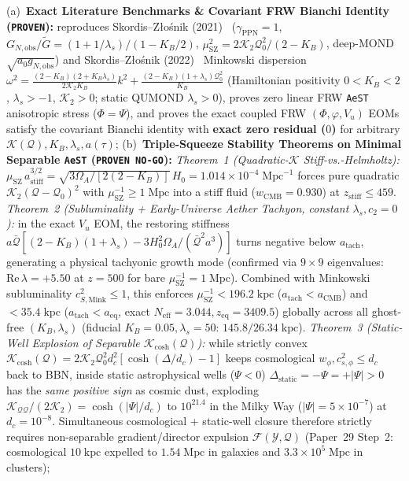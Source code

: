 \documentclass[11pt,a4paper]{article}
\begin{document}
\begin{enumerate}
    (a)~\textbf{Exact Literature Benchmarks \& Covariant FRW Bianchi Identity (\texttt{PROVEN}):} reproduces Skordis--Z{\l}o\'snik (2021)~\cite{SkordisZlosnik2021} ($\gamma_{\mathrm{PPN}}=1$, $G_{N,\mathrm{obs}}/\tilde{G} = (1+1/\lambda_s)/(1-K_B/2)$, $\mu_{\mathrm{SZ}}^2 = 2\mathcal{K}_2\mathcal{Q}_0^2/(2-K_B)$, deep-MOND $\sqrt{a_0 g_{N,\mathrm{obs}}}$) and Skordis--Z{\l}o\'snik (2022)~\cite{SkordisZlosnik2022} Minkowski dispersion $\omega^2 = \frac{(2-K_B)(2+K_B\lambda_s)}{2\mathcal{K}_2 K_B}k^2 + \frac{(2-K_B)(1+\lambda_s)\mathcal{Q}_0^2}{K_B}$ (Hamiltonian positivity $0 < K_B < 2$, $\lambda_s > -1$, $\mathcal{K}_2 > 0$; static QUMOND $\lambda_s > 0$), proves zero linear FRW \texttt{AeST} anisotropic stress ($\Phi = \Psi$), and proves the exact coupled FRW $(\Phi, \varphi, V_u)$ EOMs satisfy the covariant Bianchi identity with \textbf{exact zero residual ($0$)} for arbitrary $\mathcal{K}(\mathcal{Q}), K_B, \lambda_s, a(\tau)$;
    (b)~\textbf{Triple-Squeeze Stability Theorems on Minimal Separable \texttt{AeST} (\texttt{PROVEN NO-GO}):}
    \emph{Theorem~1 (Quadratic-$\mathcal{K}$ Stiff-vs.-Helmholtz):} $\mu_{\mathrm{SZ}}\,a_{\mathrm{stiff}}^{3/2} = \sqrt{3\Omega_A/[2(2-K_B)]}\,H_0 = 1.014\times 10^{-4}\;\mathrm{Mpc}^{-1}$ forces pure quadratic $\mathcal{K}_2(\mathcal{Q}-\mathcal{Q}_0)^2$ with $\mu_{\mathrm{SZ}}^{-1} \ge 1\;\mathrm{Mpc}$ into a stiff fluid ($w_{\mathrm{CMB}}=0.930$) at $z_{\mathrm{stiff}} \le 459$.
    \emph{Theorem~2 (Subluminality + Early-Universe Aether Tachyon, constant $\lambda_s, c_2=0$):} in the exact $V_u$ EOM, the restoring stiffness $a\bar{\mathcal{Q}}[(2-K_B)(1+\lambda_s) - 3H_0^2\Omega_A/(\bar{\mathcal{Q}}^2 a^3)]$ turns negative below $a_{\mathrm{tach}}$, generating a physical tachyonic growth mode (confirmed via $9\times 9$ eigenvalues: $\mathrm{Re}\,\lambda = +5.50$ at $z=500$ for bare $\mu_{\mathrm{SZ}}^{-1} = 1\;\mathrm{Mpc}$). Combined with Minkowski subluminality $c_{S,\mathrm{Mink}}^2 \le 1$, this enforces $\mu_{\mathrm{SZ}}^{-1} < 196.2\;\mathrm{kpc}$ ($a_{\mathrm{tach}} < a_{\mathrm{CMB}}$) and $< 35.4\;\mathrm{kpc}$ ($a_{\mathrm{tach}} < a_{\mathrm{eq}}$, exact $N_{\mathrm{eff}}=3.044, z_{\mathrm{eq}}=3409.5$) globally across all ghost-free $(K_B,\lambda_s)$ (fiducial $K_B=0.05, \lambda_s=50$: $145.8 / 26.34\;\mathrm{kpc}$).
    \emph{Theorem~3 (Static-Well Explosion of Separable $\mathcal{K}_{\cosh}(\mathcal{Q})$):} while strictly convex $\mathcal{K}_{\cosh}(\mathcal{Q}) = 2\mathcal{K}_2\mathcal{Q}_0^2 d_c^2[\cosh(\Delta/d_c)-1]$ keeps cosmological $w_\phi, c_{s,\phi}^2 \le d_c$ back to BBN, inside static astrophysical wells ($\Psi < 0$) $\Delta_{\mathrm{static}} = -\Psi = +|\Psi| > 0$ has the \emph{same positive sign} as cosmic dust, exploding $\mathcal{K}_{\mathcal{Q}\mathcal{Q}}/(2\mathcal{K}_2) = \cosh(|\Psi|/d_c)$ to $10^{21.4}$ in the Milky Way ($|\Psi|=5\times 10^{-7}$) at $d_c = 10^{-8}$. Simultaneous cosmological + static-well closure therefore strictly requires non-separable gradient/director expulsion $\mathcal{F}(\mathcal{Y},\mathcal{Q})$ (Paper~29 Step~2: cosmological $10\;\mathrm{kpc}$ expelled to $1.54\;\mathrm{Mpc}$ in galaxies and $3.3\times 10^5\;\mathrm{Mpc}$ in clusters);

\end{enumerate}
\end{document}
